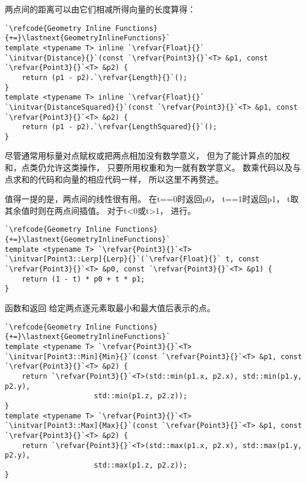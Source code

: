 两点间的距离可以由它们相减所得向量的长度算得：
\begin{lstlisting}
`\refcode{Geometry Inline Functions}{+=}\lastnext{GeometryInlineFunctions}`
template <typename T> inline `\refvar{Float}{}`
`\initvar{Distance}{}`(const `\refvar{Point3}{}`<T> &p1, const `\refvar{Point3}{}`<T> &p2) {
    return (p1 - p2).`\refvar{Length}{}`();
}
template <typename T> inline `\refvar{Float}{}`
`\initvar{DistanceSquared}{}`(const `\refvar{Point3}{}`<T> &p1, const `\refvar{Point3}{}`<T> &p2) {
    return (p1 - p2).`\refvar{LengthSquared}{}`();
}
\end{lstlisting}

尽管通常用标量对点赋权或把两点相加没有数学意义，
但为了能计算点的加权和，点类仍允许这类操作，
只要所用权重和为一就有数学意义。
数乘代码以及与点求和的代码和向量的相应代码一样，
所以这里不再赘述。

值得一提的是，两点间的线性很有用。
在{\ttfamily t==0}时返回{\ttfamily p0}，
{\ttfamily t==1}时返回{\ttfamily p1}，
{\ttfamily t}取其余值时则在两点间插值。
对于{\ttfamily t<0}或{\ttfamily t>1}，
进行。
\begin{lstlisting}
`\refcode{Geometry Inline Functions}{+=}\lastnext{GeometryInlineFunctions}`
template <typename T> `\refvar{Point3}{}`<T>
`\initvar[Point3::Lerp]{Lerp}{}`(`\refvar{Float}{}` t, const `\refvar{Point3}{}`<T> &p0, const `\refvar{Point3}{}`<T> &p1) {
    return (1 - t) * p0 + t * p1;
}
\end{lstlisting}

函数和返回
给定两点逐元素取最小和最大值后表示的点。
\begin{lstlisting}
`\refcode{Geometry Inline Functions}{+=}\lastnext{GeometryInlineFunctions}`
template <typename T> `\refvar{Point3}{}`<T>
`\initvar[Point3::Min]{Min}{}`(const `\refvar{Point3}{}`<T> &p1, const `\refvar{Point3}{}`<T> &p2) {
    return `\refvar{Point3}{}`<T>(std::min(p1.x, p2.x), std::min(p1.y, p2.y), 
                     std::min(p1.z, p2.z));
}
template <typename T> `\refvar{Point3}{}`<T>
`\initvar[Point3::Max]{Max}{}`(const `\refvar{Point3}{}`<T> &p1, const `\refvar{Point3}{}`<T> &p2) {
    return `\refvar{Point3}{}`<T>(std::max(p1.x, p2.x), std::max(p1.y, p2.y), 
                     std::max(p1.z, p2.z));
}
\end{lstlisting}

